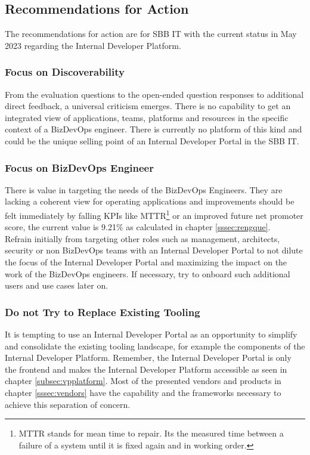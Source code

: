 \documentclass[a4paper,12pt]{article}
\begin{document}
    \subsection{Recommendations for Action}
    \label{subsec:arec}
    The recommendations for action are for SBB IT with the current status in May 2023 regarding the Internal Developer Platform.

    \subsubsection{Focus on Discoverability}
    From the evaluation questions to the open-ended question responses to additional direct feedback, a universal criticism emerges.
    There is no capability to get an integrated view of applications, teams, platforms and resources in the specific context of a BizDevOps engineer.
    There is currently no platform of this kind and could be the unique selling point of an Internal Developer Portal in the SBB IT.

    \subsubsection{Focus on BizDevOps Engineer}
    There is value in targeting the needs of the BizDevOps Engineers.
    They are lacking a coherent view for operating applications and improvements should be felt immediately by falling
    KPIs like MTTR\footnote{MTTR stands for mean time to repair. Its the measured time between a failure of a system
    until it is fixed again and in working order.} or an improved future net promoter score, the current value is 9.21\%
    as calculated in chapter \ref{sssec:rengque}.\\
    Refrain initially from targeting other roles such as management, architects, security or non BizDevOps teams with
    an Internal Developer Portal to not dilute the focus of the Internal Developer Portal and maximizing the impact on
    the work of the BizDevOps engineers.
    If necessary, try to onboard such additional users and use cases later on.

    \subsubsection{Do not Try to Replace Existing Tooling}
    It is tempting to use an Internal Developer Portal as an opportunity to simplify and consolidate the existing tooling
    landscape, for example the components of the Internal Developer Platform.
    Remember, the Internal Developer Portal is only the frontend and makes the Internal Developer Platform accessible
    as seen in chapter \ref{subsec:vpplatform}.
    Most of the presented vendors and products in chapter \ref{sssec:vendors} have the capability and the frameworks
    necessary to achieve this separation of concern.
\end{document}
